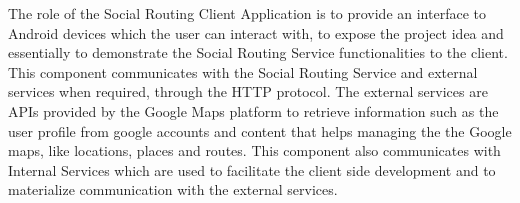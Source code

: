         The role of the Social Routing Client Application is to provide an interface to Android \cite{androiddocs} devices which the user can interact with, to expose the project 
        idea and essentially to demonstrate the Social Routing Service functionalities to the client. This component communicates with the Social Routing Service and 
        external services when required, through the HTTP protocol. The external services are APIs provided by the Google Maps platform \cite{googlemapsplatform} 
        to retrieve information such as the user profile from google accounts and content that helps managing the the Google maps, like locations, places and routes. This component
        also communicates with Internal Services which are used to facilitate the client side development and to materialize communication with the external services.